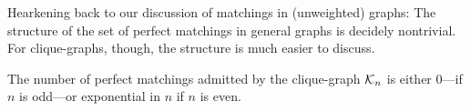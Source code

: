 
Hearkening back to our discussion of matchings in (unweighted) graphs:
The structure of the set of perfect matchings in general graphs is
decidely nontrivial.  For clique-graphs, though, the structure is much
easier to discuss.

\begin{prop}
\label{thm:perfect-matchings-clique}
The number of perfect matchings admitted by the clique-graph $\mbox{$\cal K$}_n$ is
either $0$---if $n$ is odd---or exponential in $n$ if $n$ is even.
\end{prop}

